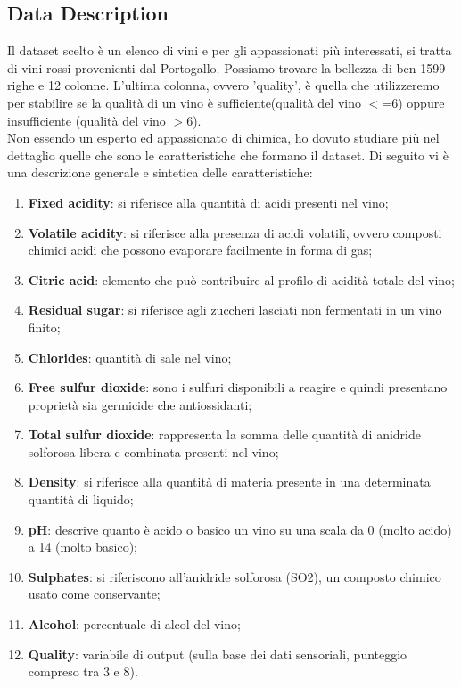 \documentclass{article}
\begin{document}
\begin{titlepage}
         \subsection{Data Description}
         Il dataset scelto è un elenco di vini e per gli appassionati più interessati, si tratta di vini rossi provenienti dal Portogallo. Possiamo trovare la bellezza di ben 1599 righe e 12 colonne. L'ultima colonna, ovvero 'quality', è quella che utilizzeremo per stabilire se la qualità di un vino è sufficiente(qualità del vino \( < \)=6) oppure insufficiente (qualità del vino \( > \)6). \\
         Non essendo un esperto ed appassionato di chimica, ho dovuto studiare più nel dettaglio quelle che sono le caratteristiche che formano il dataset. Di seguito vi è una descrizione generale e sintetica delle caratteristiche:
         \begin{enumerate}
            \item \textbf{Fixed acidity}: si riferisce alla quantità di acidi presenti nel vino;
            \item \textbf{Volatile acidity}: si riferisce alla presenza di acidi volatili, ovvero composti chimici acidi che possono evaporare facilmente in forma di gas;
            \item \textbf{Citric acid}: elemento che può contribuire al profilo di acidità totale del vino;
            \item \textbf{Residual sugar}: si riferisce agli zuccheri lasciati non fermentati in un vino finito;
            \item \textbf{Chlorides}: quantità di sale nel vino;
            \item \textbf{Free sulfur dioxide}: sono i sulfuri disponibili a reagire e quindi presentano proprietà sia germicide che antiossidanti;
            \item \textbf{Total sulfur dioxide}: rappresenta la somma delle quantità di anidride solforosa libera e combinata presenti nel vino;
            \item \textbf{Density}: si riferisce alla quantità di materia presente in una determinata quantità di liquido;
            \item \textbf{pH}: descrive quanto è acido o basico un vino su una scala da 0 (molto acido) a 14 (molto basico);
            \item \textbf{Sulphates}: si riferiscono all'anidride solforosa (SO2), un composto chimico usato come conservante;
            \item \textbf{Alcohol}: percentuale di alcol del vino;
            \item \textbf{Quality}: variabile di output (sulla base dei dati sensoriali, punteggio compreso tra 3 e 8). 
         \end{enumerate}


\end{titlepage}
\end{document}
